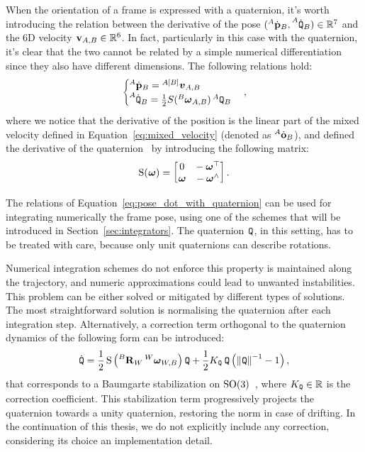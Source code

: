 When the orientation of a frame is expressed with a quaternion, it's worth introducing the relation between the derivative of the pose $(\posd[A]_B, \quatd[A]_B) \in \realn^7$ and the 6D velocity $\velsix_{A,B} \in \realn^6$.
In fact, particularly in this case with the quaternion, it's clear that the two cannot be related by a simple numerical differentiation since they also have different dimensions.
The following relations hold:
%
\begin{equation}
    \label{eq:pose_dot_with_quaternion}
    \begin{cases}
        \posd[A]_B = \vellin[{A[B]}]_{A,B} \\
        \quatd[A]_B = \frac{1}{2} S(\velang[B]_{A,B}) \quat[A]_B
    \end{cases}
    ,
\end{equation}
%
where we notice that the derivative of the position is the linear part of the mixed velocity defined in Equation~\eqref{eq:mixed_velocity} (denoted as $\orid[A]_B$), and defined the derivative of the quaternion~\parencite{sola_quaternion_2017} by introducing the following matrix:
%
\begin{equation*}
    \operatorname{S}(\velang) =
    \begin{bmatrix}
        0 & -\velang^\top \\ \velang & -\velang^\wedge
    \end{bmatrix}
    .
\end{equation*}

The relations of Equation~\eqref{eq:pose_dot_with_quaternion} can be used for integrating numerically the frame pose, using one of the schemes that will be introduced in Section~\ref{sec:integrators}.
The quaternion $\quat$, in this setting, has to be treated with care, because only unit quaternions can describe rotations.

Numerical integration schemes do not enforce this property is maintained along the trajectory, and numeric approximations could lead to unwanted instabilities.
This problem can be either solved or mitigated by different types of solutions.
The most straightforward solution is normalising the quaternion after each integration step.
Alternatively, a correction term orthogonal to the quaternion dynamics of the following form can be introduced:
%
\begin{equation*}
    \quatd = \frac{1}{2} \operatorname{S}\left( \rot[B]_W \velang[W]_{W,B} \right) \quat + \frac{1}{2} K_{\quat} \quat \left( \norm{\quat}^{-1} - 1 \right)
    ,
\end{equation*}
%
that corresponds to a Baumgarte stabilization on $\SO(3)$~\parencite{gros_baumgarte_2015}, where $K_{\quat} \in \realn$ is the correction coefficient.
This stabilization term progressively projects the quaternion towards a unity quaternion, restoring the norm in case of drifting.
In the continuation of this thesis, we do not explicitly include any correction, considering its choice an implementation detail.

